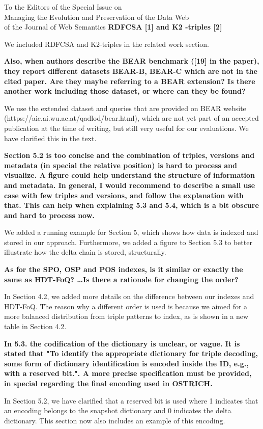 \documentclass{letter}
\newcounter{section}
\begin{document}
\begin{letter}{To the Editors of the Special Issue on\\Managing the Evolution and Preservation of the Data Web\\of the Journal of Web Semantics}
\textbf{RDFCSA [1] and K2 -triples [2]}

We included RDFCSA and K2-triples in the related work section.

\textbf{Also, when authors describe the BEAR benchmark ([19] in the paper), they report different datasets BEAR-B, BEAR-C which are not in the cited paper. Are they maybe referring to a BEAR extension? Is there another work including those dataset, or where can they be found?}

We use the extended dataset and queries that are provided on BEAR website (https://aic.ai.wu.ac.at/qadlod/bear.html),
which are not yet part of an accepted publication at the time of writing,
but still very useful for our evaluations.
We have clarified this in the text.

\textbf{Section 5.2 is too concise and the combination of triples, versions and metadata (in special the relative position) is hard to process and visualize. A figure could help understand the structure of information and metadata. In general, I would recommend to describe a small use case with few triples and versions, and follow the explanation with that. This can help when explaining 5.3 and 5.4, which is a bit obscure and hard to process now. }

We added a running example for Section 5, which shows how data is indexed and stored in our approach.
Furthermore, we added a figure to Section 5.3 to better illustrate how the delta chain is stored, structurally.

\textbf{As for the SPO, OSP and POS indexes, is it similar or exactly the same as HDT-FoQ? \ldots Is there a rationale for changing the order?}

In Section 4.2, we added more details on the difference between our indexes and HDT-FoQ.
The reason why a different order is used is because we aimed for a more balanced distribution from triple patterns to index,
as is shown in a new table in Section 4.2.

\textbf{In 5.3. the codification of the dictionary is unclear, or vague. It is stated that "To identify the appropriate dictionary for triple decoding, some form of dictionary identification is encoded inside the ID, e.g., with a reserved bit.". A more precise specification must be provided, in special regarding the final encoding used in OSTRICH.}

In Section 5.2, we have clarified that a reserved bit is used where 1 indicates that an encoding
belongs to the snapshot dictionary and 0 indicates the delta dictionary.
This section now also includes an example of this encoding.


\end{letter}
\end{document}
